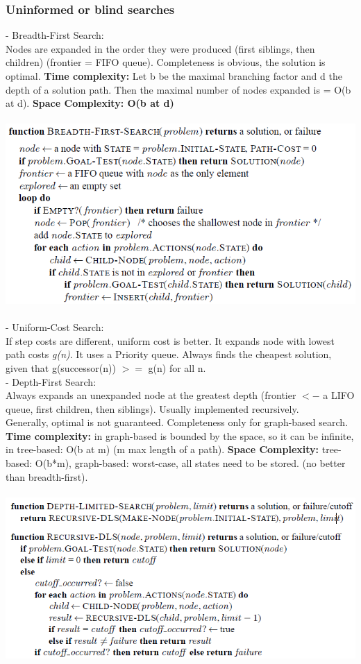 \documentclass{article}
\begin{document}
\subsubsection{Uninformed or blind searches}
- Breadth-First Search:\\
Nodes are expanded in the order they were produced (first siblings, then children) (frontier = FIFO queue). Completeness is obvious, the solution is optimal. \textbf{Time complexity: }Let b be the maximal branching factor and d the depth of a solution path. Then the maximal number of nodes expanded is = O(b at d).\textbf{ Space Complexity: O(b at d)}\\\\
\includegraphics[scale=0.6]{13.png}\\\\
- Uniform-Cost Search:\\
If step costs are different, uniform cost is better. It expands node with lowest path costs \textit{g(n)}. It uses a Priority queue. Always finds the cheapest solution, given that g(successor(n)) $>=$ g(n) for all n.\\
- Depth-First Search:\\
Always expands an unexpanded node at the greatest depth (frontier $<-$ a LIFO queue, first children, then siblings). Usually implemented recursively.\\
Generally, optimal is not guaranteed. Completeness only for graph-based search. \textbf{Time complexity: }in graph-based is bounded by the space, so it can be infinite, in tree-based: O(b at m) (m max length of a path). \textbf{Space Complexity: }tree-based: O(b*m), graph-based: worst-case, all states need to be stored. (no better than breadth-first).\\\\
\includegraphics[scale=0.6]{14.png}\\\\
\end{document}
